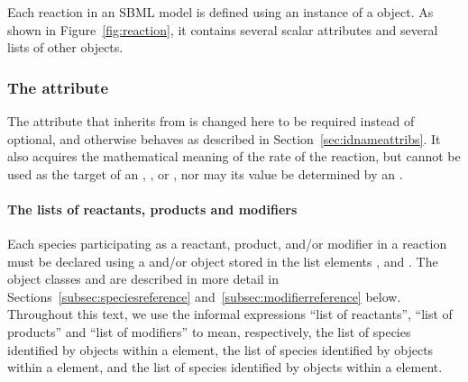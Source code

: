 \subsubsection{}
\label{sec:reaction-type}
\label{sec:listofreactants}
\label{sec:listofproducts}
\label{sec:listofmodifiers}

Each reaction in an SBML model is defined using an instance of a
\Reaction object.  As shown in Figure~\vref{fig:reaction}, it
contains several scalar attributes and several lists of other
objects.


\begin{blockChanged}
\subsubsection{The  attribute}

The  attribute that \Reaction inherits from \SBase is changed here to be required instead of optional, and otherwise behaves as described in Section~\ref{sec:idnameattribs}.  It also acquires the mathematical meaning of the rate of the reaction, but cannot be used as the target of an \InitialAssignment, \EventAssignment, or \Rule, nor may its value be determined by an \AlgebraicRule.
\end{blockChanged}

\paragraph{The lists of reactants, products and modifiers}

Each species participating as a reactant, product, and/or modifier
in a reaction must be declared using a \SpeciesReference and/or
\ModifierSpeciesReference object stored in the list elements
,  and
.  The object classes \SpeciesReference and
\ModifierSpeciesReference are described in more detail in
Sections~\ref{subsec:speciesreference}
and~\ref{subsec:modifierreference} below.  Throughout this text,
we use the informal expressions ``list of reactants'', ``list of
products'' and ``list of modifiers'' to mean, respectively, the
list of species identified by \SpeciesReference objects within a
\Reaction {} element, the list of species
identified by \SpeciesReference objects within a \Reaction
{} element, and the list of species identified
by \ModifierSpeciesReference objects within a \Reaction
{} element.

